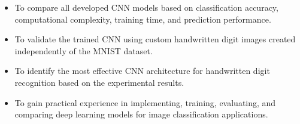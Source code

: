 \begin{itemize}
\item To compare all developed CNN models based on classification accuracy, computational complexity, training time, and prediction performance.

\item To validate the trained CNN using custom handwritten digit images created independently of the MNIST dataset.

\item To identify the most effective CNN architecture for handwritten digit recognition based on the experimental results.

\item To gain practical experience in implementing, training, evaluating, and comparing deep learning models for image classification applications.

\end{itemize}